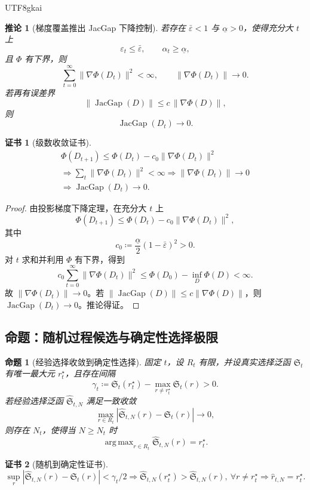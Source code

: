 \documentclass[12pt]{article}
\newtheorem{proposition}{命题}[section]
\newtheorem{corollary}{推论}[section]
\newtheorem{Certificate}{证书}[section]
\newcommand{\DefEq}{\coloneqq}
\DeclareMathOperator{\JacGap}{JacGap}
\DeclareMathOperator*{\argmax}{arg\,max}
\begin{document}
\begin{CJK*}{UTF8}{gkai}
\begin{corollary}[梯度覆盖推出 JacGap 下降控制]
若存在 \(\bar\varepsilon<1\) 与 \(\underline\alpha>0\)，使得充分大 \(t\) 上
\[
\varepsilon_t\le\bar\varepsilon,
\qquad
\alpha_t\ge\underline\alpha,
\]
且 \(\Phi\) 有下界，则
\[
\sum_{t=0}^{\infty}\|\nabla\Phi(D_t)\|^2<\infty,
\qquad
\|\nabla\Phi(D_t)\|\to0.
\]
若再有误差界
\[
\|\JacGap(D)\|
\le c\,\|\nabla\Phi(D)\|,
\]
则
\[
\JacGap(D_t)\to0.
\]
\end{corollary}

\begin{Certificate}[级数收敛证书]
\[
\boxed{
\begin{gathered}
\Phi(D_{t+1})
\le
\Phi(D_t)
-c_0\|\nabla\Phi(D_t)\|^2
\\
\Rightarrow
\sum_t\|\nabla\Phi(D_t)\|^2<\infty
\Rightarrow
\|\nabla\Phi(D_t)\|\to0
\\
\Rightarrow
\JacGap(D_t)\to0.
\end{gathered}
}
\]
\end{Certificate}

\begin{proof}
由投影梯度下降定理，在充分大 \(t\) 上
\[
\Phi(D_{t+1})
\le
\Phi(D_t)-c_0\|\nabla\Phi(D_t)\|^2,
\]
其中
\[
c_0
\DefEq
\frac{\underline\alpha}{2}(1-\bar\varepsilon)^2>0.
\]
对 \(t\) 求和并利用 \(\Phi\) 有下界，得到
\[
c_0\sum_{t=0}^{\infty}\|\nabla\Phi(D_t)\|^2
\le
\Phi(D_0)-\inf_D\Phi(D)<\infty.
\]
故 \(\|\nabla\Phi(D_t)\|\to0\)。若
\(\|\JacGap(D)\|\le c\|\nabla\Phi(D)\|\)，则
\(\JacGap(D_t)\to0\)。推论得证。
\end{proof}

\subsection{命题：随机过程候选与确定性选择极限}
\label{subsec:stochastic-deterministic-limit}

\begin{proposition}[经验选择收敛到确定性选择]
固定 \(t\)，设 \(R_t\) 有限，并设真实选择泛函 \(\mathfrak S_t\) 有唯一最大元
\(r_t^\star\)，且存在间隔
\[
\gamma_t
\DefEq
\mathfrak S_t(r_t^\star)
-
\max_{r\ne r_t^\star}\mathfrak S_t(r)
>0.
\]
若经验选择泛函 \(\widehat{\mathfrak S}_{t,N}\) 满足一致收敛
\[
\max_{r\in R_t}
\left|
\widehat{\mathfrak S}_{t,N}(r)-\mathfrak S_t(r)
\right|
\longrightarrow0,
\]
则存在 \(N_t\)，使得当 \(N\ge N_t\) 时
\[
\argmax_{r\in R_t}\widehat{\mathfrak S}_{t,N}(r)
=
r_t^\star.
\]
\end{proposition}

\begin{Certificate}[随机到确定性证书]
\[
\boxed{
\sup_r|\widehat{\mathfrak S}_{t,N}(r)-\mathfrak S_t(r)|
<\gamma_t/2
\Rightarrow
\widehat{\mathfrak S}_{t,N}(r_t^\star)
>
\widehat{\mathfrak S}_{t,N}(r),\ \forall r\ne r_t^\star
\Rightarrow
\widehat r_{t,N}=r_t^\star.
}
\]
\end{Certificate}


\end{CJK*}
\end{document}
